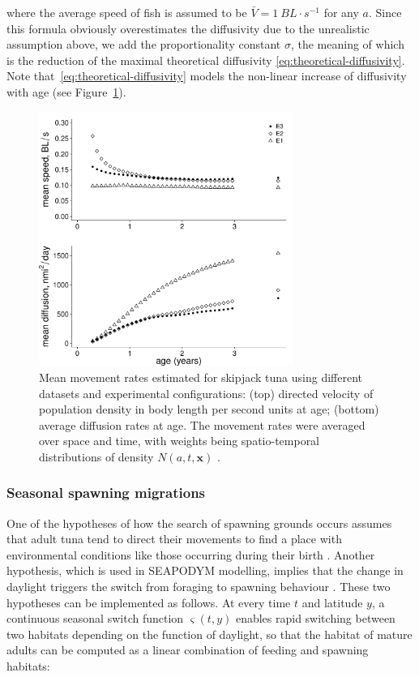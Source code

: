 \noindent where the average speed of fish is assumed to be $\bar{V}=1~BL \cdot s^{-1}$ for any $a$. Since this formula obviously overestimates the diffusivity due to the unrealistic assumption above, we add the proportionality constant $\sigma$, the meaning of which is the reduction of the maximal theoretical diffusivity \eqref{eq:theoretical-diffusivity}. Note that~\eqref{eq:theoretical-diffusivity} models the non-linear increase of diffusivity with age (see Figure~\ref{fig:mean-movement}).

\begin{figure}[htbp]
  \centering
  \includegraphics[width=0.74\textwidth]{chapter1/figs/mean_movement_rates}
  \caption{Mean movement rates estimated for skipjack tuna using different datasets and experimental configurations: (top) directed velocity of population density in body length per second units at age; (bottom) average diffusion rates at age. The movement rates were averaged over space and time, with weights being spatio-temporal distributions of density $N(a,t,\mathbf{x})$ \citep*[see][for more details]{Senina2016}.}
  \label{fig:mean-movement}
\end{figure}

\subsubsection{Seasonal spawning migrations}\label{sec:seasonal-migrations}
One of the hypotheses of how the search of spawning grounds occurs assumes that adult tuna tend to direct their movements to find a place with environmental conditions like those occurring during their birth \citep*[see e.g.,][]{Cury}. Another hypothesis, which is used in SEAPODYM modelling, implies that the change in daylight triggers the switch from foraging to spawning behaviour \citep{Lehodey2008}. These two hypotheses can be implemented as follows. At every time $t$ and latitude $y$, a continuous seasonal switch function $\varsigma(t,y)$ enables rapid switching between two habitats depending on the function of daylight, so that the habitat of mature adults can be computed as a linear combination of feeding and spawning habitats:


